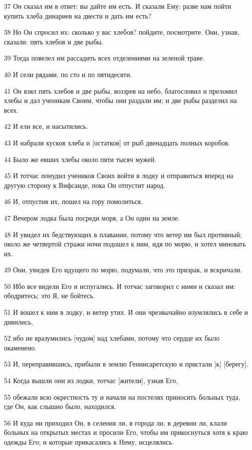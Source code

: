 \par 37 Он сказал им в ответ: вы дайте им есть. И сказали Ему: разве нам пойти купить хлеба динариев на двести и дать им есть?
\par 38 Но Он спросил их: сколько у вас хлебов? пойдите, посмотрите. Они, узнав, сказали: пять хлебов и две рыбы.
\par 39 Тогда повелел им рассадить всех отделениями на зеленой траве.
\par 40 И сели рядами, по сто и по пятидесяти.
\par 41 Он взял пять хлебов и две рыбы, воззрев на небо, благословил и преломил хлебы и дал ученикам Своим, чтобы они раздали им; и две рыбы разделил на всех.
\par 42 И ели все, и насытились.
\par 43 И набрали кусков хлеба и [остатков] от рыб двенадцать полных коробов.
\par 44 Было же евших хлебы около пяти тысяч мужей.
\par 45 И тотчас понудил учеников Своих войти в лодку и отправиться вперед на другую сторону к Вифсаиде, пока Он отпустит народ.
\par 46 И, отпустив их, пошел на гору помолиться.
\par 47 Вечером лодка была посреди моря, а Он один на земле.
\par 48 И увидел их бедствующих в плавании, потому что ветер им был противный; около же четвертой стражи ночи подошел к ним, идя по морю, и хотел миновать их.
\par 49 Они, увидев Его идущего по морю, подумали, что это призрак, и вскричали.
\par 50 Ибо все видели Его и испугались. И тотчас заговорил с ними и сказал им: ободритесь; это Я, не бойтесь.
\par 51 И вошел к ним в лодку, и ветер утих. И они чрезвычайно изумлялись в себе и дивились,
\par 52 ибо не вразумились [чудом] над хлебами, потому что сердце их было окаменено.
\par 53 И, переправившись, прибыли в землю Геннисаретскую и пристали [к] [берегу].
\par 54 Когда вышли они из лодки, тотчас [жители], узнав Его,
\par 55 обежали всю окрестность ту и начали на постелях приносить больных туда, где Он, как слышно было, находился.
\par 56 И куда ни приходил Он, в селения ли, в города ли, в деревни ли, клали больных на открытых местах и просили Его, чтобы им прикоснуться хотя к краю одежды Его; и которые прикасались к Нему, исцелялись.

